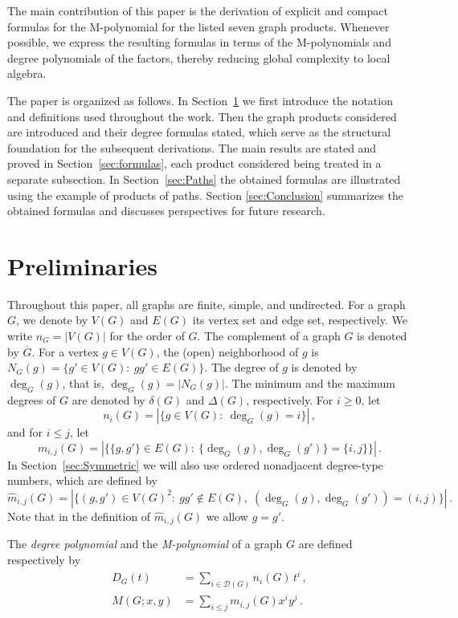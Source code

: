 \documentclass[letterpaper,12pt]{article}
\begin{document}
The main contribution of this paper is the derivation of
explicit and compact formulas for the M-polynomial for the listed seven graph products. Whenever possible, we express the resulting formulas in terms of the M-polynomials and degree polynomials of the factors,
thereby reducing global complexity to local algebra.  

The paper is organized as follows. In Section~\ref{sec:Preliminaries} we first introduce the notation and definitions used throughout the work.  Then the graph products considered are introduced and their degree formulas stated, which serve as the structural foundation for the subsequent derivations. The main results are stated and proved in Section~\ref{sec:formulas}, each product considered being treated in a separate subsection. In Section~\ref{sec:Paths} the obtained formulas are illustrated using the example of products of paths. Section \ref{sec:Conclusion} summarizes the obtained formulas and discusses perspectives for future research.

\section{Preliminaries}
\label{sec:Preliminaries}

Throughout this paper, all graphs are finite, simple, and undirected. 
For a graph $G$, we denote by $V(G)$ and $E(G)$ its vertex set and edge set, respectively. We write $n_G = |V(G)|$ for the order of $G$. The complement of a graph $G$ is denoted by $\overline{G}$. For a vertex $g \in V(G)$, the (open) neighborhood of $g$ is $N_G(g) = \{g' \in V(G):\ gg' \in E(G)\}$. The degree of $g$ is denoted by $\deg_G(g)$, that is, $\deg_G(g) = |N_G(g)|$. The minimum and the maximum degrees of $G$ are denoted by $\delta(G)$ and $\Delta(G)$, respectively. For $i \ge 0$, let 
\[
n_i(G) = |\{g \in V(G):\ \deg_G(g) = i\}|\,,
\]
and for $i \le j$, let 
\[
m_{i,j}(G) = |\{\{g,g'\} \in E(G):\ \{\deg_G(g), \deg_G(g')\} = \{i,j\}\}|\,.
\]
In Section~\ref{sec:Symmetric} we will also use ordered nonadjacent degree-type numbers, which are defined by 
\[
\widehat{m}_{i,j}(G)
=
|\{(g,g') \in V(G)^2:\ gg' \notin E(G),\; (\deg_G(g),\deg_G(g'))=(i,j)\}|\,.
\]
Note that in the definition of $\widehat m_{i,j}(G)$ we allow $g=g'$. 

The {\em degree polynomial} and the {\em M-polynomial} of a graph $G$ are defined respectively  by
\begin{align*}
D_G(t) & = \sum_{i \in \mathcal{{D}}(G)} n_i(G)\, t^i\,, \\
M(G;x,y) & = \sum_{i \le j} m_{i,j}(G) x^i y^j\,.
\end{align*}
\end{document}
